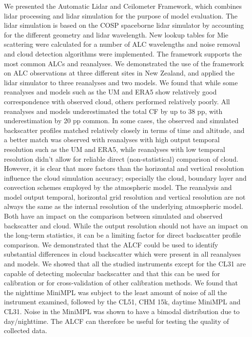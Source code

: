 We presented the Automatic Lidar and
Ceilometer Framework, which combines lidar processing and lidar simulation
for the purpose of model evaluation. The lidar simulation is based on
the COSP spaceborne lidar simulator by accounting for the different geometry
and lidar wavelength. New lookup tables for Mie scattering were calculated
for a number of ALC wavelengths and noise removal and cloud detection algorithms
were implemented. The framework supports the most common ALCs and reanalyses.
We demonstrated the use of the framework
on ALC observations at three different sites in New Zealand,
and applied the lidar simulator to three reanalyses and two models. We found that while
some reanalyses and models such as the UM and ERA5 show relatively good correspondence with observed
cloud, others performed relatively poorly. All reanalyses and models
underestimated the total CF by up to 38 pp, with underestimation by 20 pp
common. In some cases, the observed and simulated backscatter profiles matched
relatively closely in terms of time and altitude, and a better match was observed
with reanalyses with high output temporal resolution such as the UM and ERA5,
while reanalyses with low temporal resolution didn't allow for reliable direct (non-statistical) comparison of cloud.
However, it is clear that more factors than the horizontal and vertical
resolution influence the cloud simulation
accuracy; especially the cloud, boundary layer and convection schemes employed
by the atmospheric model.
The reanalysis and model output temporal, horizontal grid resolution
and vertical resolution are not always the same as the internal resolution of
the underlying atmospheric model. Both have an impact on the comparison
between simulated and observed backscatter and cloud.
While the output resolution should not have an impact on the long-term
statistics, it can be a limiting factor for direct backscatter profile comparison.
We demonstrated that the ALCF could be used to identify substantial
differences in cloud backscatter which were present in all reanalyses and models.
We showed that all the studied instruments except for the CL31 are capable of
detecting molecular backscatter and that this can be used for calibration or for cross-validation of other calibration methods.
We found that the nighttime MiniMPL was subject to the least amount of noise of all the instrument examined, followed
by the CL51, CHM 15k, daytime MiniMPL and CL31. Noise in the MiniMPL was shown to have a bimodal distribution due to day/nighttime.
The ALCF can therefore be useful for testing the quality of collected data.

